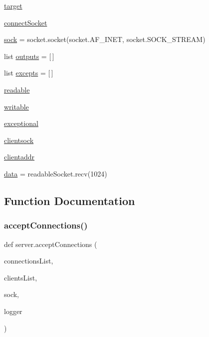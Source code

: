 \begin{DoxyCompactItemize}
\item 
\hyperlink{namespaceserver_a6c2bf59cef00216ae7fee937e55f013d}{target}
\item 
\hyperlink{namespaceserver_ace8bd717303af3e13cd4dba46b2cd5f1}{connect\+Socket}
\item 
\hyperlink{namespaceserver_a995df52292d049e26620aefae8eb4e1d}{sock} = socket.\+socket(socket.\+A\+F\+\_\+\+I\+N\+ET, socket.\+S\+O\+C\+K\+\_\+\+S\+T\+R\+E\+AM)
\item 
list \hyperlink{namespaceserver_af6312e19169c5addc1dafc4954287d67}{outputs} = \mbox{[}$\,$\mbox{]}
\item 
list \hyperlink{namespaceserver_a8a14948c5211d04b3a2b33b730b991b2}{excepts} = \mbox{[}$\,$\mbox{]}
\item 
\hyperlink{namespaceserver_accef440b565edfb162319da0f775b284}{readable}
\item 
\hyperlink{namespaceserver_accc7fda5853169f8f74f25dfb423b576}{writable}
\item 
\hyperlink{namespaceserver_aa9a1622b227ab6db4b65781454c92504}{exceptional}
\item 
\hyperlink{namespaceserver_ab8d0bbcdb7423e60b0d370a6d21a1781}{clientsock}
\item 
\hyperlink{namespaceserver_a90279b585d4f187d0908de4962d5cb8d}{clientaddr}
\item 
\hyperlink{namespaceserver_a8b7790a9997c09aa90cf4a121a310d5c}{data} = readable\+Socket.\+recv(1024)
\end{DoxyCompactItemize}


\subsection{Function Documentation}
\mbox{\label{namespaceserver_ac1ec62c626a3425033381ef5718ce12b}} 
\subsubsection{\texorpdfstring{accept\+Connections()}{acceptConnections()}}
{\footnotesize\ttfamily def server.\+accept\+Connections (\begin{DoxyParamCaption}\item[{}]{connections\+List,  }\item[{}]{clients\+List,  }\item[{}]{sock,  }\item[{}]{logger }\end{DoxyParamCaption})}


